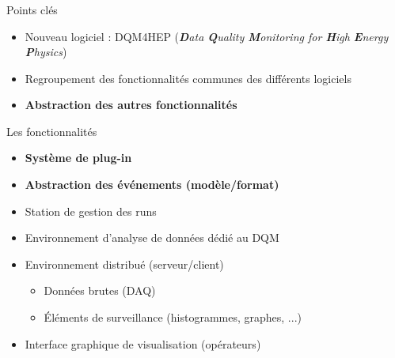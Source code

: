 \documentclass[8pt]{beamer}
\begin{document}
  \begin{frame}
  \frametitle{\secname}
  \framesubtitle{\subsecname}
    \begin{block}{Points clés}
      \begin{itemize}
        \item Nouveau logiciel : DQM4HEP (\textit{\textbf{D}ata \textbf{Q}uality \textbf{M}onitoring for \textbf{H}igh \textbf{E}nergy \textbf{P}hysics})
        \item Regroupement des fonctionnalités communes des différents logiciels
        \item \textbf{Abstraction des autres fonctionnalités}
      \end{itemize}
    \end{block}
    \pause
    \begin{block}{Les fonctionnalités}
      \begin{itemize}
        \item \textbf{Système de plug-in}
        \item \textbf{Abstraction des événements (modèle/format)}
        \item Station de gestion des runs
        \item Environnement d'analyse de données dédié au DQM
        \item Environnement distribué (serveur/client)
        \begin{itemize}
          \item Données brutes (DAQ)
          \item Éléments de surveillance (histogrammes, graphes, ...)
        \end{itemize}
        \item Interface graphique de visualisation (opérateurs)
      \end{itemize}
    \end{block}
  \end{frame}
\end{document}
